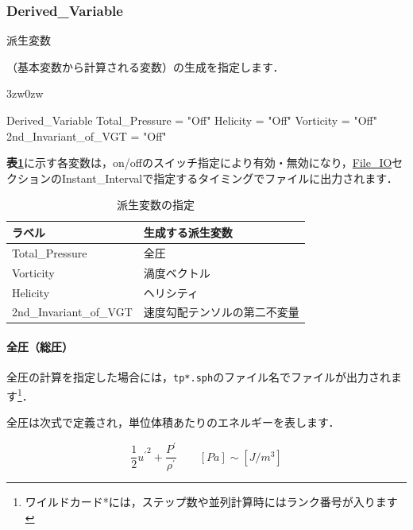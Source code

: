 \pagebreak
\subsubsection{Derived\_Variable}

\hypertarget{tgt:derived_variable}{派生変数}（基本変数から計算される変数）の生成を指定します．

\begin{indentation}{3zw}{0zw}

{\small
\begin{program}
  Derived_Variable {
    Total_Pressure       = "Off"
    Helicity             = "Off"
    Vorticity            = "Off"
    2nd_Invariant_of_VGT = "Off"
  }
\end{program}
}

\textbf{表\ref{tbl:derived vars}}に示す各変数は，on/offのスイッチ指定により有効・無効になり，\hyperlink{tgt:fileio}{File\_IO}セクションのInstant\_Intervalで指定するタイミングでファイルに出力されます．

\begin{table}[htdp]
\caption{派生変数の指定}
\begin{center}
\small
\begin{tabular}{ll}\toprule
ラベル & 生成する派生変数\\ \midrule
Total\_Pressure & 全圧\\
Vorticity & 渦度ベクトル\\
Helicity & ヘリシティ\\
2nd\_Invariant\_of\_VGT & 速度勾配テンソルの第二不変量\\ \bottomrule
\end{tabular}
\end{center}
\label{tbl:derived vars}
\end{table}

%
\paragraph{全圧（総圧）}
全圧の計算を指定した場合には，\verb|tp*.sph|のファイル名でファイルが出力されます\footnote{ワイルドカード*には，ステップ数や並列計算時にはランク番号が入ります}．


全圧は次式で定義され，単位体積あたりのエネルギーを表します．

\begin{equation}
\frac{1}{2} {u^{\prime}}^{2} + \frac{P^{\prime}}{\rho^{\prime}} \qquad [Pa] \sim [J/m^3]
\label{eq:total pressure}
\end{equation}


\end{indentation}
